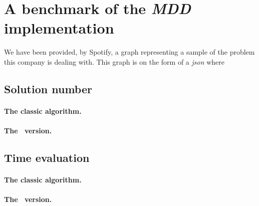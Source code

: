 \section{A benchmark of the \textit{MDD} implementation}

We have been provided, by Spotify, a graph representing a sample of the problem this company is dealing with. This graph is on the form of a \textit{json} where

\subsection{Solution number}



\paragraph{The classic algorithm.}

\paragraph{The \alldiff\ version.}

\subsection{Time evaluation}

\paragraph{The classic algorithm.}

\paragraph{The \alldiff\ version.}
% 